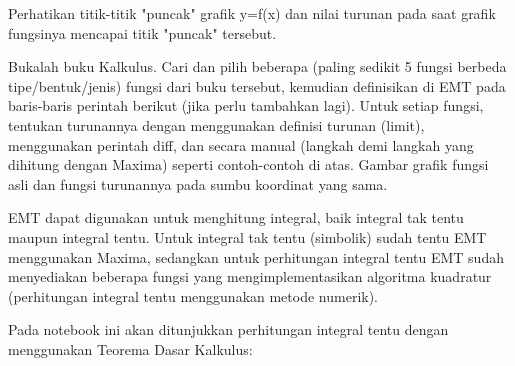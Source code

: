\documentclass[a4paper,10pt]{article}
\begin{document}
\begin{eulernotebook}
\begin{eulercomment}
\begin{eulercomment}
\begin{eulercomment}
\begin{eulercomment}
\begin{eulercomment}
\begin{eulercomment}
\begin{eulercomment}
\begin{eulercomment}
\begin{eulercomment}
\begin{eulercomment}
\begin{eulercomment}
\begin{eulercomment}
\begin{eulercomment}
\begin{eulercomment}
\begin{eulercomment}
\begin{eulercomment}
\begin{eulercomment}
\begin{eulercomment}
\begin{eulercomment}
\begin{eulercomment}
\begin{eulercomment}
\begin{eulercomment}
\begin{eulercomment}
\begin{eulercomment}
\begin{eulercomment}
\begin{eulercomment}
\begin{eulercomment}
\begin{eulercomment}
\begin{eulercomment}
Perhatikan titik-titik "puncak" grafik y=f(x) dan nilai turunan pada
saat grafik fungsinya mencapai titik "puncak" tersebut.
\end{eulercomment}
\begin{eulercomment}
Bukalah buku Kalkulus. Cari dan pilih beberapa (paling sedikit 5
fungsi berbeda tipe/bentuk/jenis) fungsi dari buku tersebut, kemudian
definisikan di EMT pada baris-baris perintah berikut (jika perlu
tambahkan lagi). Untuk setiap fungsi, tentukan turunannya dengan
menggunakan definisi turunan (limit), menggunakan perintah diff, dan
secara manual (langkah demi langkah yang dihitung dengan Maxima)
seperti contoh-contoh di atas. Gambar grafik fungsi asli dan fungsi
turunannya pada sumbu koordinat yang sama.
\end{eulercomment}
\begin{eulercomment}
EMT dapat digunakan untuk menghitung integral, baik integral tak tentu
maupun integral tentu. Untuk integral tak tentu (simbolik) sudah tentu
EMT menggunakan Maxima, sedangkan untuk perhitungan integral tentu EMT
sudah menyediakan beberapa fungsi yang mengimplementasikan algoritma
kuadratur (perhitungan integral tentu menggunakan metode numerik).

Pada notebook ini akan ditunjukkan perhitungan integral tentu dengan
menggunakan Teorema Dasar Kalkulus:


\end{eulercomment}
\end{eulercomment}
\end{eulercomment}
\end{eulercomment}
\end{eulercomment}
\end{eulercomment}
\end{eulercomment}
\end{eulercomment}
\end{eulercomment}
\end{eulercomment}
\end{eulercomment}
\end{eulercomment}
\end{eulercomment}
\end{eulercomment}
\end{eulercomment}
\end{eulercomment}
\end{eulercomment}
\end{eulercomment}
\end{eulercomment}
\end{eulercomment}
\end{eulercomment}
\end{eulercomment}
\end{eulercomment}
\end{eulercomment}
\end{eulercomment}
\end{eulercomment}
\end{eulercomment}
\end{eulercomment}
\end{eulercomment}
\end{eulernotebook}
\end{document}
